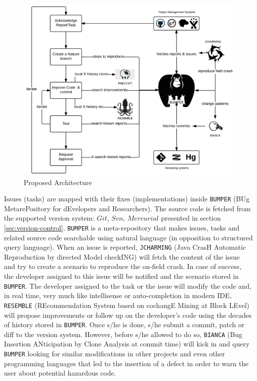 \begin{figure}[h!]
	\centering
	\includegraphics[scale=0.9]{media/proposal.png}
	\caption{Proposed Architecture}
	\label{fig:proposal}
\end{figure}


Issues (tasks) are  mapped with their fixes (implementations) inside {\tt BUMPER} (BUg MetarePository for dEvelopers and Researchers). The source code is fetched from the supported version system: $Git$, $Svn$, $Mercurial$ presented in section \ref{sec:version-control}.
{\tt BUMPER} is a meta-repository that makes issues, tasks and related source code searchable using natural language  (in opposition to structured query language).
When an issue is reported, {\tt JCHARMING} (Java CrasH Automatic Reproduction by directed Model checkING) will fetch the content of the issue and try to create a scenario to reproduce the on-field crash. In case of success, the developer assigned to this issue will be notified and the scenario stored in {\tt BUMPER}.
The developer assigned to the task or the issue will modify the code and, in real time, very much like intellisense or auto-completion in modern IDE, {\tt RESEMBLE} (REcommendation System based on cochangE Mining at Block LEvel) will propose improvements or follow up on the developer's code using the decades of history stored in {\tt BUMPER}. Once s/he is done, s/he submit a commit, patch or diff to the version system.
However, before s/he allowed to do so, {\tt BIANCA} (Bug Insertion ANticipation by Clone Analysis at commit time) will kick in and query {\tt BUMPER} looking for similar modifications in other projects and even other programming languages that led to the insertion of a defect in order to warn the user about potential hazardous code.


